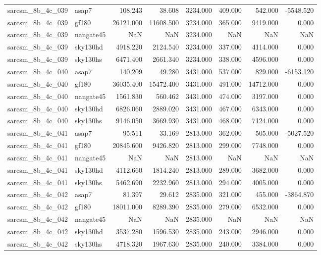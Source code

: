 \begin{tabular}{llrrrrrr}
sarcsm\_8b\_4c\_039 & asap7 & 108.243 & 38.608 & 3234.000 & 409.000 & 542.000 & -5548.520 \\
sarcsm\_8b\_4c\_039 & gf180 & 26121.000 & 11608.500 & 3234.000 & 365.000 & 9419.000 & 0.000 \\
sarcsm\_8b\_4c\_039 & nangate45 & NaN & NaN & 3234.000 & NaN & NaN & NaN \\
sarcsm\_8b\_4c\_039 & sky130hd & 4918.220 & 2124.540 & 3234.000 & 337.000 & 4114.000 & 0.000 \\
sarcsm\_8b\_4c\_039 & sky130hs & 6471.400 & 2661.340 & 3234.000 & 338.000 & 4596.000 & 0.000 \\
sarcsm\_8b\_4c\_040 & asap7 & 140.209 & 49.280 & 3431.000 & 537.000 & 829.000 & -6153.120 \\
sarcsm\_8b\_4c\_040 & gf180 & 36035.400 & 15472.400 & 3431.000 & 491.000 & 14712.000 & 0.000 \\
sarcsm\_8b\_4c\_040 & nangate45 & 1561.830 & 560.462 & 3431.000 & 474.000 & 3197.000 & 0.000 \\
sarcsm\_8b\_4c\_040 & sky130hd & 6826.060 & 2889.020 & 3431.000 & 467.000 & 6343.000 & 0.000 \\
sarcsm\_8b\_4c\_040 & sky130hs & 9146.050 & 3669.930 & 3431.000 & 468.000 & 7124.000 & 0.000 \\
sarcsm\_8b\_4c\_041 & asap7 & 95.511 & 33.169 & 2813.000 & 362.000 & 505.000 & -5027.520 \\
sarcsm\_8b\_4c\_041 & gf180 & 20845.600 & 9426.820 & 2813.000 & 299.000 & 7748.000 & 0.000 \\
sarcsm\_8b\_4c\_041 & nangate45 & NaN & NaN & 2813.000 & NaN & NaN & NaN \\
sarcsm\_8b\_4c\_041 & sky130hd & 4112.660 & 1814.240 & 2813.000 & 289.000 & 3682.000 & 0.000 \\
sarcsm\_8b\_4c\_041 & sky130hs & 5462.690 & 2232.960 & 2813.000 & 294.000 & 4005.000 & 0.000 \\
sarcsm\_8b\_4c\_042 & asap7 & 81.397 & 29.612 & 2835.000 & 321.000 & 455.000 & -3864.870 \\
sarcsm\_8b\_4c\_042 & gf180 & 18011.000 & 8289.390 & 2835.000 & 279.000 & 6532.000 & 0.000 \\
sarcsm\_8b\_4c\_042 & nangate45 & NaN & NaN & 2835.000 & NaN & NaN & NaN \\
sarcsm\_8b\_4c\_042 & sky130hd & 3537.280 & 1596.530 & 2835.000 & 243.000 & 2946.000 & 0.000 \\
sarcsm\_8b\_4c\_042 & sky130hs & 4718.320 & 1967.630 & 2835.000 & 240.000 & 3384.000 & 0.000 \\

\end{tabular}
